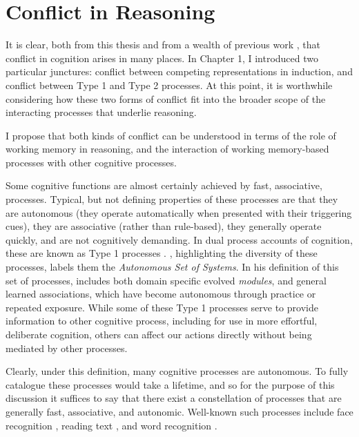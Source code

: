 
\section{Conflict in Reasoning}\label{sec:ch7-conflict}

It is clear, both from this thesis and from a wealth of previous work
\citep{DeNeys2012,Crisp-Bright2010,Botvinick2004a,Miller2001},
that conflict in cognition arises in many places.
In Chapter 1, I introduced two particular junctures:
conflict between competing representations in induction,
and conflict between Type 1 and Type 2 processes.
At this point, it is worthwhile considering
how these two forms of conflict fit into
the broader scope of the interacting processes
that underlie reasoning.

I propose that
both kinds of conflict
can be understood in terms of
the role of working memory in reasoning,
and the interaction of working memory-based processes
with other cognitive processes.

Some cognitive functions
are almost certainly achieved by
fast, associative, processes.
Typical, but not defining properties of these processes are that
they are autonomous (they operate automatically
when presented with their triggering cues),
they are associative (rather than rule-based),
they generally operate quickly,
and are not cognitively demanding.
In dual process accounts of cognition,
these are known as Type 1 processes
\citep[or, in the past, as \emph{System 1}; e.g.][]{Sloman1996}.
\citet{Stanovich2005,Stanovich2009}, highlighting the diversity of these processes,
labels them the \emph{Autonomous Set of Systems}.
In his definition of this set of processes,
\citet{Stanovich2009} includes
both domain specific evolved \emph{modules},
and general learned associations,
which have become autonomous through practice or repeated exposure.
While some of these Type 1 processes serve to
provide information to other cognitive process,
including for use in more effortful, deliberate cognition,
others can affect our actions directly
without being mediated by other processes.


Clearly, under this definition, many cognitive processes are autonomous.
To fully catalogue these processes would take a lifetime,
and so for the purpose of this discussion
it suffices to say that there exist a constellation of processes
that are generally fast, associative, and autonomic.
Well-known such processes include face recognition
\citep[largely an evolved processes,
  localised to the fusiform gyrus;][]{Kanwisher1997},
reading text \citep[a learned skill
  that maps onto the left fusifom gyrus;][]{McCandliss2003},
and word recognition \citep[e.g.][]{Spivey2005}.


